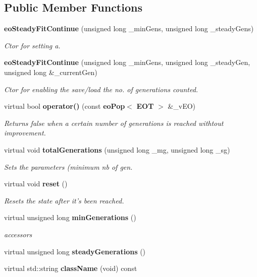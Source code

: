 \subsection*{Public Member Functions}
\begin{CompactItemize}
\item 
{\bf eo\-Steady\-Fit\-Continue} (unsigned long \_\-min\-Gens, unsigned long \_\-steady\-Gens)\label{classeo_steady_fit_continue_a0}

\begin{CompactList}\small\item\em Ctor for setting a. \item\end{CompactList}\item 
{\bf eo\-Steady\-Fit\-Continue} (unsigned long \_\-min\-Gens, unsigned long \_\-steady\-Gen, unsigned long \&\_\-current\-Gen)\label{classeo_steady_fit_continue_a1}

\begin{CompactList}\small\item\em Ctor for enabling the save/load the no. of generations counted. \item\end{CompactList}\item 
virtual bool {\bf operator()} (const {\bf eo\-Pop}$<$ {\bf EOT} $>$ \&\_\-v\-EO)\label{classeo_steady_fit_continue_a2}

\begin{CompactList}\small\item\em Returns false when a certain number of generations is reached withtout improvement. \item\end{CompactList}\item 
virtual void {\bf total\-Generations} (unsigned long \_\-mg, unsigned long \_\-sg)
\begin{CompactList}\small\item\em Sets the parameters (minimum nb of gen. \item\end{CompactList}\item 
virtual void {\bf reset} ()\label{classeo_steady_fit_continue_a4}

\begin{CompactList}\small\item\em Resets the state after it's been reached. \item\end{CompactList}\item 
virtual unsigned long {\bf min\-Generations} ()\label{classeo_steady_fit_continue_a5}

\begin{CompactList}\small\item\em accessors \item\end{CompactList}\item 
virtual unsigned long {\bf steady\-Generations} ()\label{classeo_steady_fit_continue_a6}

\item 
virtual std::string {\bf class\-Name} (void) const \label{classeo_steady_fit_continue_a7}

\end{CompactItemize}
